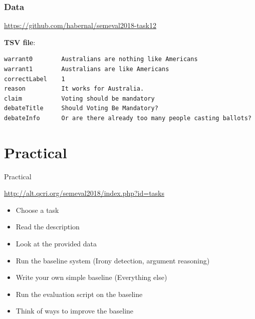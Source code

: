 \documentclass[10pt, compress]{beamer}
\begin{document}
\begin{frame}[fragile]
\frametitle{Data}

\url{https://github.com/habernal/semeval2018-task12}


\textbf{TSV file}:

{\small
\begin{verbatim}
warrant0        Australians are nothing like Americans
warrant1        Australians are like Americans
correctLabel    1
reason          It works for Australia. 
claim           Voting should be mandatory
debateTitle     Should Voting Be Mandatory?
debateInfo      Or are there already too many people casting ballots?
\end{verbatim}
}

\end{frame}




\section{Practical}

\begin{frame}{Practical}

\begin{center}
\url{http://alt.qcri.org/semeval2018/index.php?id=tasks}
\end{center}

\begin{itemize}
  \item Choose a task
  \item Read the description
  \item Look at the provided data
\end{itemize}

\begin{itemize}
  \item Run the baseline system (Irony detection, argument reasoning)
  \item Write your own simple baseline (Everything else)
\end{itemize}

\begin{itemize}
  \item Run the evaluation script on the baseline
  \item Think of ways to improve the baseline
\end{itemize}

\end{frame}
\end{document}
